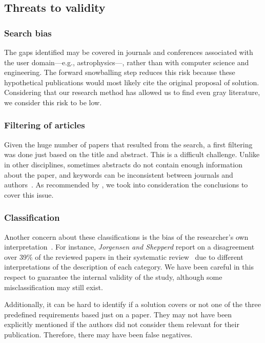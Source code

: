 \subsection{Threats to validity}
\label{sec:mapping/threats}
\subsubsection{Search bias}
The gaps identified may be covered in
journals and conferences associated with the user domain---e.g., astrophysics---,
rather than with computer science and engineering. The forward snowballing
step reduces this risk because these hypothetical publications would most likely
cite the original proposal of solution. Considering that our research method has
allowed us to find even gray literature, we consider this risk to be low.

\subsubsection{Filtering of articles}
Given the huge number of papers that resulted from the search,
a first filtering was done just based on the title and abstract.
This is a difficult challenge. Unlike in other disciplines, sometimes abstracts
do not contain enough information about the paper, and keywords can be inconsistent
between journals and authors~\cite{Budgen2008,Brereton2007,Jalali2012}.
As recommended by \cite{Brereton2007}, we took into consideration
the conclusions to cover this issue.

\subsubsection{Classification}
Another concern about these classifications is the bias of the researcher's own
interpretation~\cite{MacLure2005}.
For instance, \emph{Jorgensen and Shepperd} report on a disagreement over
39\% of the reviewed papers in their systematic review~\cite{Jorgensen2007}
due to different interpretations of the description of each category. We
have been careful in this respect to guarantee the internal validity of the
study, although some misclassification may still exist.

Additionally, it can be hard to identify if a solution covers or not one of the
three predefined requirements based just on a paper. They may not have been
explicitly mentioned if the authors did not consider them relevant for their publication. Therefore, there may have been false negatives.

